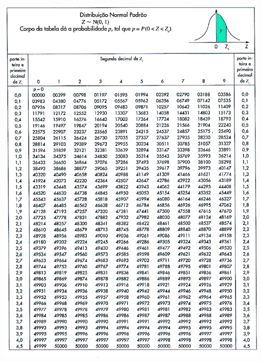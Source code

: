 \documentclass[a4paper,12pt,oneside,onecolumn]{Config/milktest}
\begin{document}
\newpage
\thispagestyle{plain}
\centering\includegraphics[scale=0.7]{Figuras/Tabela_Normal_padrao.pdf}
\end{document}
